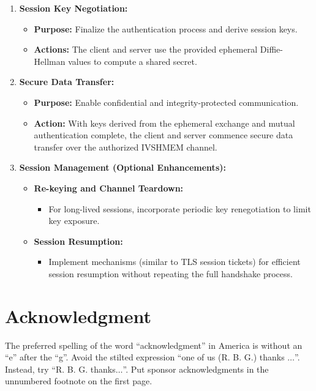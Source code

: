 \documentclass[conference]{IEEEtran}
\begin{document}
\begin{enumerate}[label=\arabic*.]
  \item \textbf{Session Key Negotiation:}
    \begin{itemize}
      \item \textbf{Purpose:} Finalize the authentication process and derive session keys.
      \item \textbf{Actions:} The client and server use the provided ephemeral Diffie-Hellman values to compute a shared secret.
    \end{itemize}
    
  \item \textbf{Secure Data Transfer:}
    \begin{itemize}
      \item \textbf{Purpose:} Enable confidential and integrity-protected communication.
      \item \textbf{Action:} With keys derived from the ephemeral exchange and mutual authentication complete, the client and server commence secure data transfer over the authorized IVSHMEM channel.
    \end{itemize}
    
  \item \textbf{Session Management (Optional Enhancements):}
    \begin{itemize}
      \item \textbf{Re-keying and Channel Teardown:}
        \begin{itemize}
          \item For long-lived sessions, incorporate periodic key renegotiation to limit key exposure.
        \end{itemize}
      \item \textbf{Session Resumption:}
        \begin{itemize}
          \item Implement mechanisms (similar to TLS session tickets) for efficient session resumption without repeating the full handshake process.
        \end{itemize}
    \end{itemize}
\end{enumerate}




\section*{Acknowledgment}

The preferred spelling of the word ``acknowledgment'' in America is without 
an ``e'' after the ``g''. Avoid the stilted expression ``one of us (R. B. 
G.) thanks $\ldots$''. Instead, try ``R. B. G. thanks$\ldots$''. Put sponsor 
acknowledgments in the unnumbered footnote on the first page.
\end{document}
